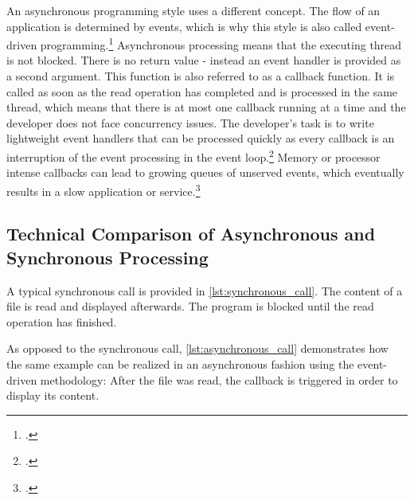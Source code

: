 An asynchronous programming style uses a different concept. The flow of an
application is determined by events, which is why this style is also called
event-driven programming.\footcite[Cf.][16]{teixeira_2012} Asynchronous processing means
that the executing thread is not blocked. There is no
return value - instead an event handler is provided as a second argument.
This function is also referred to as a callback function. It is called as soon
as the read operation has completed and is processed in the same thread, which
means that there is at most one callback running at a time and the developer
does not face concurrency issues.
The developer’s task is to write lightweight event handlers that can be
processed quickly as every callback is an interruption of the event processing
in the event loop.\footcite[Cf.][]{Croucher_2012} Memory or processor intense
callbacks can lead to growing queues of unserved events, which eventually
results in a slow application or service.\footcite[Cf.][48]{teixeira_2012}


\subsection{Technical Comparison of Asynchronous and Synchronous Processing}
\label{comparison_syncasync}


A typical synchronous call is provided in \autoref{lst:synchronous_call}. The
content of a file is read and displayed afterwards. The program is blocked until the
read operation has finished.



As opposed to the synchronous call, \autoref{lst:asynchronous_call} demonstrates
how the same example can be realized in an asynchronous fashion using the event-driven
methodology: After the file was read, the callback is triggered in order to
display its content.






